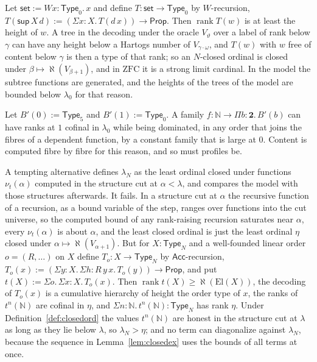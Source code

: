 \documentclass[10pt]{article}
\newcommand{\N}{\mathbb{N}}
\newcommand{\Prop}{\mathsf{Prop}}
\newcommand{\Type}{\mathsf{Type}}
\newcommand{\ZFC}{\mathrm{ZFC}}
\newcommand{\rk}{\operatorname{rank}}
\newcommand{\hartogs}{\aleph}
\newcommand{\El}{\mathrm{El}}
\newcommand{\Acc}{\mathsf{Acc}}
\begin{document}
\begin{example}\label{ex:set}
Let $\mathsf{set}:=Wx{:}\Type_0.\,x$ and define $T:\mathsf{set}\to\Type_0$ by
$W$-recursion, $T(\mathsf{sup}\,X\,d):=(\Sigma x{:}X.\,T(d\,x))\to\Prop$. Then
$\rk T(w)$ is at least the height of $w$. A tree in the decoding under
the oracle $V_\vartheta$ over a label of rank below $\gamma$ can have any
height below a Hartogs number of $V_{\gamma\cdot\omega}$, and $T(w)$ with
$w$ free of content below $\gamma$ is then a type of that rank; so an
$N$-closed ordinal is closed under $\beta\mapsto\hartogs(V_{\beta+1})$, and
in $\ZFC$ it is a strong limit cardinal. In the model the subtree
functions are generated, and the heights of the trees of the model are
bounded below $\lambda_0$ for that reason.
\end{example}

\begin{example}\label{ex:hetero}
Let $B'(0):=\Type_5$ and $B'(1):=\Type_0$. A family
$f:\N\to\Pi b{:}\mathbf 2.\,B'(b)$ can have ranks at $1$ cofinal in
$\lambda_0$ while being dominated, in any order that joins the fibres of
a dependent function, by a constant family that is large at $0$. Content
is computed fibre by fibre for this reason, and so must profiles be.
\end{example}

\begin{example}\label{ex:sat}
A tempting alternative defines $\lambda_N$ as the least ordinal closed
under functions $\nu_t(\alpha)$ computed in the structure cut at
$\alpha<\lambda$, and compares the model with those structures
afterwards. It fails. In a structure cut at $\alpha$ the recursive
function of a recursion, as a bound variable of the step, ranges over
functions into the cut universe, so the computed bound of any
rank-raising recursion saturates near $\alpha$, every $\nu_t(\alpha)$ is
about $\alpha$, and the least closed ordinal is just the least ordinal
$\eta$ closed under $\alpha\mapsto\hartogs(V_{\alpha+1})$. But for
$X:\Type_N$ and a well-founded linear order $o=(R,\dots)$ on $X$ define
$T_o:X\to\Type_N$ by $\Acc$-recursion,
$T_o(x):=(\Sigma y{:}X.\,\Sigma h{:}R\,y\,x.\,T_o(y))\to\Prop$, and put
$t(X):=\Sigma o.\,\Sigma x{:}X.\,T_o(x)$. Then $\rk t(X)\ge\hartogs(\El(X))$,
the decoding of $T_o(x)$ is a cumulative hierarchy of height the order
type of $x$, the ranks of $t^n(\N)$ are cofinal in $\eta$, and
$\Sigma n{:}\N.\,t^n(\N):\Type_N$ has rank $\eta$. Under
Definition~\ref{def:closedord} the values $t^n(\N)$ are honest in the
structure cut at $\lambda$ as long as they lie below $\lambda$, so
$\lambda_N>\eta$; and no term can diagonalize against $\lambda_N$,
because the sequence in Lemma~\ref{lem:closedex} uses the bounds of all
terms at once.
\end{example}
\end{document}

